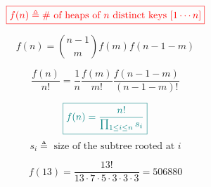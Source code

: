 \begin{frame}{}
  \[
    \textcolor{red}{\boxed{f(n) \triangleq \text{\# of heaps of } n \text{ distinct keys } [1 \cdots n]}}
  \]

  \pause
  \[
    f(n) = \binom{n-1}{m} f(m) f(n-1-m)
  \]

  \pause
  \vspace{0.50cm}
  \[
    \frac{f(n)}{n!} = \frac{1}{n} \frac{f(m)}{m!} \frac{f(n-1-m)}{(n-1-m)!}
  \]

  \pause
  \vspace{0.50cm}
  \[
    \textcolor{teal}{\boxed{f(n) = \frac{n!}{\prod_{1 \le i \le n} s_i}}}
  \]
  \[
    s_i \triangleq \text{ size of the subtree rooted at } i
  \]
\end{frame}

\begin{frame}{}

  \[
    f(13) = \frac{13!}{13 \cdot 7 \cdot 5 \cdot 3 \cdot 3 \cdot 3} = 506880
  \]
\end{frame}
